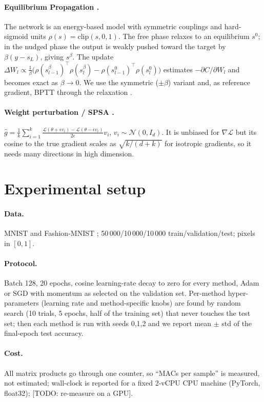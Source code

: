 \documentclass[11pt]{article}
\newcommand{\todo}[1]{{\color{red}[TODO: #1]}}
\begin{document}
\paragraph{Equilibrium Propagation \cite{scellier2017}.} The network is an energy-based model with symmetric couplings and hard-sigmoid units $\rho(s)=\mathrm{clip}(s,0,1)$. The free phase relaxes to an equilibrium $s^0$; in the nudged phase the output is weakly pushed toward the target by $\beta(y-s_L)$, giving $s^{\beta}$. The update $\Delta W_l\propto\frac1\beta\big(\rho(s^\beta_{l-1})^{\!\top}\rho(s^\beta_l)-\rho(s^0_{l-1})^{\!\top}\rho(s^0_l)\big)$ estimates $-\partial C/\partial W_l$ and becomes exact as $\beta\to0$. We use the symmetric ($\pm\beta$) variant \cite{laborieux2021} and, as reference gradient, BPTT through the relaxation \cite{ernoult2019}.

\paragraph{Weight perturbation / SPSA \cite{spall1992,baydin2022}.} $\hat g=\frac1k\sum_{i=1}^k\frac{\mathcal L(\theta+\epsilon v_i)-\mathcal L(\theta-\epsilon v_i)}{2\epsilon}v_i$, $v_i\sim\mathcal N(0,I_d)$. It is unbiased for $\nabla\mathcal L$ but its cosine to the true gradient scales as $\sqrt{k/(d+k)}$ for isotropic gradients, so it needs many directions in high dimension.

\section{Experimental setup}\label{sec:setup}
\paragraph{Data.} MNIST \cite{lecun1998} and Fashion-MNIST \cite{xiao2017fmnist}; 50\,000/10\,000/10\,000 train/validation/test; pixels in $[0,1]$.
\paragraph{Protocol.} Batch 128, 20 epochs, cosine learning-rate decay to zero for every method, Adam \cite{kingma2015} or SGD with momentum as selected on the validation set. Per-method hyper-parameters (learning rate and method-specific knobs) are found by random search (10 trials, 5 epochs, half of the training set) that never touches the test set; then each method is run with seeds 0,1,2 and we report mean $\pm$ std of the final-epoch test accuracy.
\paragraph{Cost.} All matrix products go through one counter, so ``MACs per sample'' is measured, not estimated; wall-clock is reported for a fixed 2-vCPU CPU machine (PyTorch, float32); \todo{re-measure on a GPU}.
\end{document}
